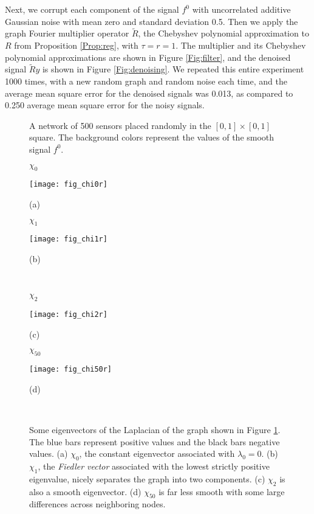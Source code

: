 \documentclass[conference]{IEEEtran}
\begin{document}
Next, we corrupt each component of the signal $f^0$ with uncorrelated additive Gaussian noise with mean zero and standard deviation 0.5. Then we apply the graph Fourier multiplier operator $\tilde{R}$, the Chebyshev polynomial approximation to $R$ from Proposition \ref{Prop:reg}, with $\tau=r=1$. The multiplier and its Chebyshev polynomial approximations are shown in Figure \ref{Fig:filter}, and the denoised signal $\tilde{R}y$ is shown in Figure \ref{Fig:denoising}. We repeated this entire experiment 1000 times, with a new random graph and random noise each time, and the average mean square error for the denoised signals was 0.013, as compared to 0.250 average mean square error for the noisy signals.
\begin{figure}
\caption{A network of 500 sensors placed randomly in the $[0,1] \times [0,1]$ square. The background colors represent the values of the smooth signal $f^0$. } \label{Fig:network} \end{figure}
\begin{figure}[tb]
\centering
\begin{minipage}[b]{0.43\linewidth}
   \centering
   \centerline{\small{$\chi_0$}}
   \centerline{\texttt{[image: fig\_chi0r]}}
\centerline{\small{(a)}}
\end{minipage}
\hfill
\begin{minipage}[b]{0.43\linewidth}
   \centering
   \centerline{\small{$\chi_1$}}
   \centerline{\texttt{[image: fig\_chi1r]}}
\centerline{\small{(b)}}
\end{minipage}\\
\vspace{0.4cm}
\begin{minipage}[b]{0.43\linewidth}
   \centering
   \centerline{\small{$\chi_2$}}
   \centerline{\texttt{[image: fig\_chi2r]}}
\centerline{\small{(c)}}
\end{minipage}
\hfill
\begin{minipage}[b]{0.43\linewidth}
   \centering
   \centerline{\small{$\chi_{50}$}}
   \centerline{\texttt{[image: fig\_chi50r]}}
\centerline{\small{(d)}}
\end{minipage}\\
\caption {Some eigenvectors of the Laplacian of the graph shown in Figure \ref{Fig:network}. The blue bars represent positive values and the black bars negative values. (a) $\chi_0$, the constant eigenvector associated with $\lambda_{0}=0$. (b) $\chi_1$, the \emph{Fiedler vector} associated with the lowest strictly positive eigenvalue, nicely separates the graph into two components. (c) $\chi_2$ is also a smooth eigenvector. (d) $\chi_{50}$ is far less smooth
with some large differences across neighboring nodes.}
  \label{Fig:eigenvectors}
\end{figure}
\end{document}
